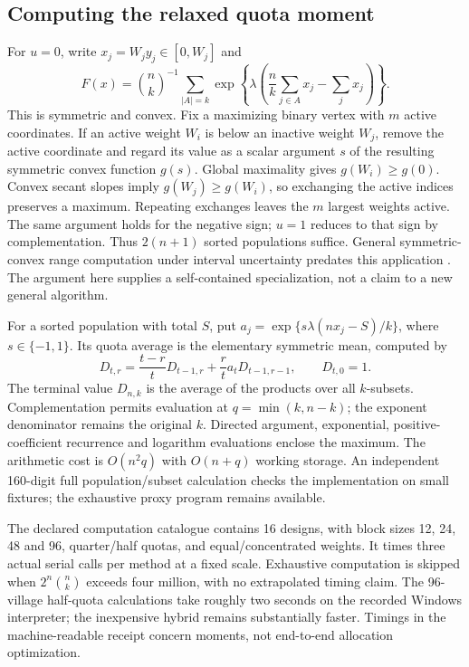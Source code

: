 \documentclass[11pt]{article}
\begin{document}
\subsection{Computing the relaxed quota moment}\label{app:quotacomputation}
For $u=0$, write $x_j=W_jy_j\in[0,W_j]$ and
\[
 F(x)=\binom nk^{-1}\sum_{|A|=k}\exp\left\{\lambda\left(\frac nk\sum_{j\in A}x_j-\sum_jx_j\right)\right\}.
\]
This is symmetric and convex. Fix a maximizing binary vertex with $m$ active coordinates. If an active weight $W_i$ is below an inactive weight $W_j$, remove the active coordinate and regard its value as a scalar argument $s$ of the resulting symmetric convex function $g(s)$. Global maximality gives $g(W_i)\geq g(0)$. Convex secant slopes imply $g(W_j)\geq g(W_i)$, so exchanging the active indices preserves a maximum. Repeating exchanges leaves the $m$ largest weights active. The same argument holds for the negative sign; $u=1$ reduces to that sign by complementation. Thus $2(n+1)$ sorted populations suffice. General symmetric-convex range computation under interval uncertainty predates this application \citep{xiang2006}. The argument here supplies a self-contained specialization, not a claim to a new general algorithm.

For a sorted population with total $S$, put $a_j=\exp\{s\lambda(nx_j-S)/k\}$, where $s\in\{-1,1\}$. Its quota average is the elementary symmetric mean, computed by
\[
 D_{t,r}=\frac{t-r}{t}D_{t-1,r}+\frac rt a_tD_{t-1,r-1},\qquad D_{t,0}=1.
\]
The terminal value $D_{n,k}$ is the average of the products over all $k$-subsets. Complementation permits evaluation at $q=\min(k,n-k)$; the exponent denominator remains the original $k$. Directed argument, exponential, positive-coefficient recurrence and logarithm evaluations enclose the maximum. The arithmetic cost is $O(n^2q)$ with $O(n+q)$ working storage. An independent 160-digit full population/subset calculation checks the implementation on small fixtures; the exhaustive proxy program remains available.

The declared computation catalogue contains 16 designs, with block sizes 12, 24, 48 and 96, quarter/half quotas, and equal/concentrated weights. It times three actual serial calls per method at a fixed scale. Exhaustive computation is skipped when $2^n\binom nk$ exceeds four million, with no extrapolated timing claim. The 96-village half-quota calculations take roughly two seconds on the recorded Windows interpreter; the inexpensive hybrid remains substantially faster. Timings in the machine-readable receipt concern moments, not end-to-end allocation optimization.
\end{document}

